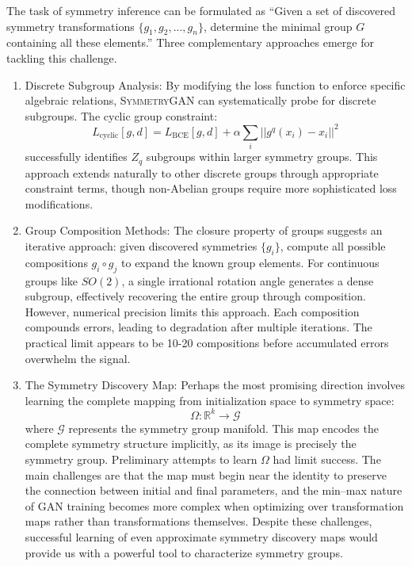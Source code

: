             The task of symmetry inference can be formulated as ``Given a set of discovered symmetry transformations \(\{g_1, g_2, ..., g_n\}\), determine the minimal group \(G\) containing all these elements.''
            Three complementary approaches emerge for tackling this challenge.
            \begin{enumerate}
                \item Discrete Subgroup Analysis: By modifying the loss function to enforce specific algebraic relations, \textsc{SymmetryGAN} can systematically probe for discrete subgroups.
                The cyclic group constraint:
                \[
                    L_{\text{cyclic}}[g,d] = L_{\text{BCE}}[g,d] + \alpha \sum_i ||g^q(x_i) - x_i||^2
                \]
                successfully identifies \(Z_q\) subgroups within larger symmetry groups.
                This approach extends naturally to other discrete groups through appropriate constraint terms, though non-Abelian groups require more sophisticated loss modifications.
                \item Group Composition Methods: The closure property of groups suggests an iterative approach: given discovered symmetries \(\{g_i\}\), compute all possible compositions \(g_i \circ g_j\) to expand the known group elements.
                For continuous groups like \(SO(2)\), a single irrational rotation angle generates a dense subgroup, effectively recovering the entire group through composition.
                However, numerical precision limits this approach.
                Each composition compounds errors, leading to degradation after multiple iterations.
                The practical limit appears to be 10-20 compositions before accumulated errors overwhelm the signal.
                \item The Symmetry Discovery Map: Perhaps the most promising direction involves learning the complete mapping from initialization space to symmetry space:
                \[
                    \Omega: \mathbb{R}^k \rightarrow \mathcal{G}
                \]
                where \(\mathcal{G}\) represents the symmetry group manifold.
                This map encodes the complete symmetry structure implicitly, as its image is precisely the symmetry group.
                Preliminary attempts to learn \(\Omega\) had limit success.
                The main challenges are that the map must begin near the identity to preserve the connection between initial and final parameters, and the min--max nature of GAN training becomes more complex when optimizing over transformation maps rather than transformations themselves.
                Despite these challenges, successful learning of even approximate symmetry discovery maps would provide us with a powerful tool to characterize symmetry groups.
            \end{enumerate}


